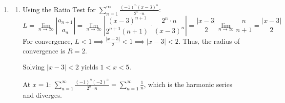 \documentclass[a4paper, 12pt]{article}
\begin{document}
\begin{enumerate}[leftmargin=*,label=\textbf{\arabic*.}]
\begin{enumerate}[leftmargin=*,label=\textbf{\alph*.}]
Consider the integral $I = \int_{0}^{3} \frac{1}{x^5} \, dx$.
\[I=\int_{0}^{3} x^{-5} \, dx = \lim_{R \to 0^+} \left[ \frac{x^{-4}}{-4} \right]_{R}^{3} = \lim_{R \to 0^+} \left( -\frac{1}{4(3^4)} + \frac{1}{4R^4} \right) = \infty\]

Since $I$ diverges and $\frac{(1+e^{-x})(x^3+x+1)}{x^5} \ge \frac{1}{x^5} > 0$ on $(0, 3]$, by the Direct Comparison Test, the integral $\int_{0}^{3} \frac{(1+e^{-x})(x^3+x+1)}{x^5} \, dx$ also $\boxed{\text{diverges}}$.

\item \begin{enumerate}[leftmargin=*,label=\textbf{\roman*.}]
\item Rotating the region $R$ bounded by $y = x^3+x$, $y = 2$, and $x = 0$ around the $x$-axis using the Washer Method ($x \in [0, 1]$):
\[V_1 = \pi \int_{0}^{1} \left( (2)^2 - (x^3+x)^2 \right) dx = \pi \int_{0}^{1} \left( 4 - (x^6 + 2x^4 + x^2) \right) dx\]
\[V_1=\pi\left[4x-\frac{x^7}7-\frac{2x^5}5-\frac{x^3}3\right]_0^1=\pi\left(4-\frac17-\frac25-\frac13\right)=\boxed{\frac{328\pi}{105}}\]

\item Rotating the same region around the $y$-axis using the Shell Method.
\[V_2=2\pi\int_0^1x\left(2-(x^3+x) \right) dx = 2\pi \int_{0}^{1} (2x - x^4 - x^2) \, dx\]
\[V_2=2\pi\left[x^2-\frac{x^5}5-\frac{x^3}3\right]_0^1=2\pi\left(1-\frac15-\frac13\right)=2\pi \left(\frac7{15}\right)=\boxed{\frac{14\pi}{15}}\]
\end{enumerate}
\end{enumerate}

\item \begin{enumerate}[leftmargin=*,label=\textbf{\alph*.}]
\item Using the Ratio Test for $\sum_{n=1}^{\infty} \frac{(-1)^n (x-3)^n}{2^n \cdot n}$:
\[L = \lim_{n \to \infty} \left| \frac{a_{n+1}}{a_n} \right| = \lim_{n \to \infty} \left| \frac{(x-3)^{n+1}}{2^{n+1}(n+1)} \cdot \frac{2^n \cdot n}{(x-3)^n} \right| = \frac{|x-3|}{2} \lim_{n \to \infty} \frac{n}{n+1} = \frac{|x-3|}{2}\]
For convergence, $L < 1 \implies \frac{|x-3|}{2} < 1 \implies |x-3| < 2$.
Thus, the radius of convergence is $\boxed{R = 2}$.

Solving $|x-3| < 2$ yields $1 < x < 5$.

At $x = 1$: $\sum_{n=1}^{\infty} \frac{(-1)^n (-2)^n}{2^n \cdot n} = \sum_{n=1}^{\infty} \frac{1}{n}$, which is the harmonic series and diverges.


\end{enumerate}
\end{enumerate}
\end{document}
